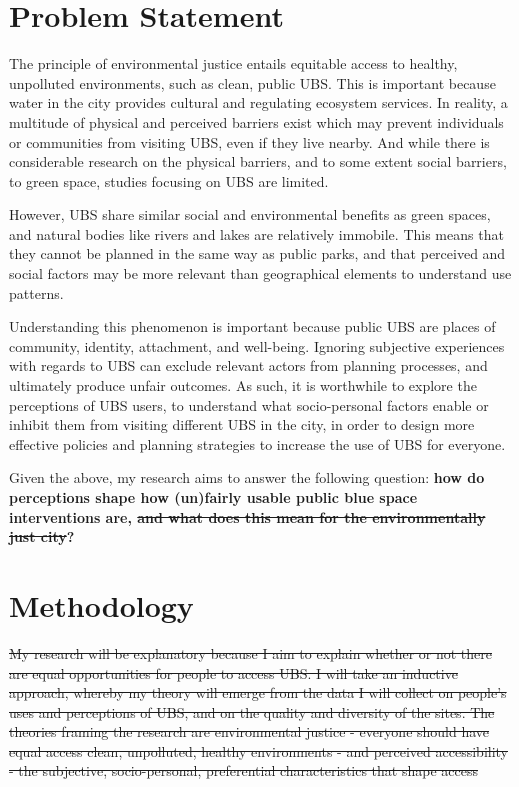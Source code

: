 \documentclass{article}
\begin{document}
\section{Problem Statement}

The principle of environmental justice entails equitable access to healthy, unpolluted environments, such as clean, public UBS. This is important because water in the city provides cultural and regulating ecosystem services.
In reality, a multitude of physical and perceived barriers exist which may prevent individuals or communities from visiting UBS, even if they live nearby. And while there is considerable research on the physical barriers, and to some extent social barriers, to green space, studies focusing on UBS are limited.

However, UBS share similar social and environmental benefits as green spaces, and natural bodies like rivers and lakes are relatively immobile. This means that they cannot be planned in the same way as public parks, and that perceived and social factors may be more relevant than geographical elements to understand use patterns.

Understanding this phenomenon is important because public UBS are places of community, identity, attachment, and well-being. Ignoring subjective experiences with regards to UBS can exclude relevant actors from planning processes, and ultimately produce unfair outcomes. 
As such, it is worthwhile to explore the perceptions of UBS users, to understand what socio-personal factors enable or inhibit them from visiting different UBS in the city, in order to design more effective policies and planning strategies to increase the use of UBS for everyone.

Given the above, my research aims to answer the following question: \textbf{how do perceptions shape how (un)fairly usable public blue space interventions are, \sout{and what does this mean for the environmentally just city}?}

\section{Methodology}

\sout{My research will be explanatory because I aim to explain whether or not there are equal opportunities for people to access UBS. I will take an inductive approach, whereby my theory will emerge from the data I will collect on people’s uses and perceptions of UBS, and on the quality and diversity of the sites. The theories framing the research are environmental justice - everyone should have equal access clean, unpolluted, healthy environments - and perceived accessibility - the subjective, socio-personal, preferential characteristics that shape access}
\end{document}
